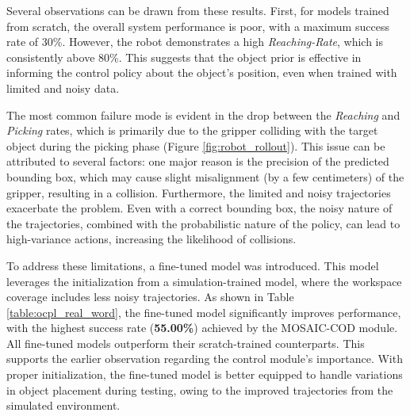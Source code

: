 Several observations can be drawn from these results. First, for models trained from scratch, the overall system performance is poor, with a maximum success rate of 30\%. However, the robot demonstrates a high \textit{Reaching-Rate}, which is consistently above 80\%. This suggests that the object prior is effective in informing the control policy about the object's position, even when trained with limited and noisy data. 

The most common failure mode is evident in the drop between the \textit{Reaching} and \textit{Picking} rates, which is primarily due to the gripper colliding with the target object during the picking phase (Figure \ref{fig:robot_rollout}). This issue can be attributed to several factors: one major reason is the precision of the predicted bounding box, which may cause slight misalignment (by a few centimeters) of the gripper, resulting in a collision. Furthermore, the limited and noisy trajectories exacerbate the problem. Even with a correct bounding box, the noisy nature of the trajectories, combined with the probabilistic nature of the policy, can lead to high-variance actions, increasing the likelihood of collisions.


To address these limitations, a fine-tuned model was introduced. This model leverages the initialization from a simulation-trained model, where the workspace coverage includes less noisy trajectories. As shown in Table \ref{table:ocpl_real_word}, the fine-tuned model significantly improves performance, with the highest success rate (\textbf{55.00\%}) achieved by the MOSAIC-COD module. All fine-tuned models outperform their scratch-trained counterparts. This supports the earlier observation regarding the control module's importance. With proper initialization, the fine-tuned model is better equipped to handle variations in object placement during testing, owing to the improved trajectories from the simulated environment.

